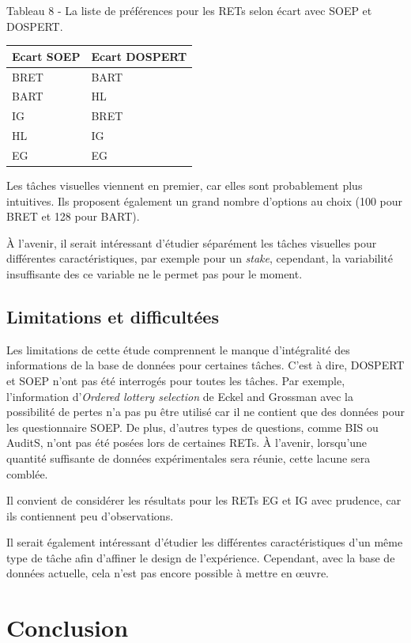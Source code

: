 \documentclass[12pt]{article}
\begin{document}
Tableau 8 - La liste de préférences pour les RETs selon écart avec SOEP
et DOSPERT.

\begin{longtable}[]{@{}ll@{}}
\toprule()
Ecart SOEP & Ecart DOSPERT \\
\midrule()
\endhead
BRET & BART \\
BART & HL \\
IG & BRET \\
HL & IG \\
EG & EG \\
\bottomrule()
\end{longtable}

Les tâches visuelles viennent en premier, car elles sont probablement
plus intuitives. Ils proposent également un grand nombre d'options au
choix (100 pour BRET et 128 pour BART).

À l'avenir, il serait intéressant d'étudier séparément les tâches
visuelles pour différentes caractéristiques, par exemple pour un
\emph{stake}, cependant, la variabilité insuffisante des ce variable ne
le permet pas pour le moment.

\subsection{Limitations et difficultées}

Les limitations de cette étude comprennent le manque d'intégralité des
informations de la base de données pour certaines tâches. C'est à dire,
DOSPERT et SOEP n'ont pas été interrogés pour toutes les tâches. Par
exemple, l'information d'\emph{Ordered lottery selection} de Eckel and
Grossman avec la possibilité de pertes n'a pas pu être utilisé car il ne
contient que des données pour les questionnaire SOEP. De plus, d'autres
types de questions, comme BIS ou AuditS, n'ont pas été posées lors de
certaines RETs. À l'avenir, lorsqu'une quantité suffisante de données
expérimentales sera réunie, cette lacune sera comblée.

Il convient de considérer les résultats pour les RETs EG et IG avec
prudence, car ils contiennent peu d'observations.

Il serait également intéressant d'étudier les différentes
caractéristiques d'un même type de tâche afin d'affiner le design de
l'expérience. Cependant, avec la base de données actuelle, cela n'est
pas encore possible à mettre en œuvre.

\section{Conclusion}
\end{document}
